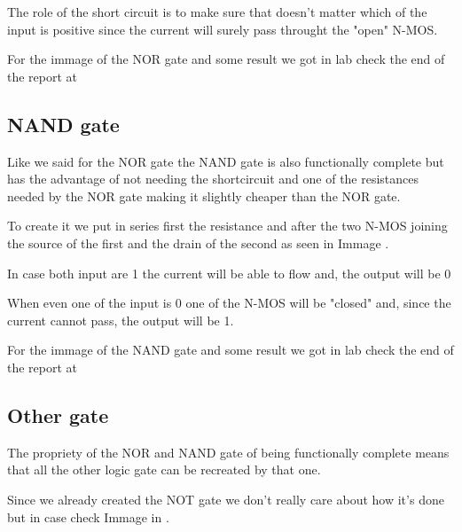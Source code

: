 \documentclass{article}
\begin{document}
The role of the short circuit is to make sure that doesn't matter which of the input is positive since the current will surely pass throught the "open" N-MOS.

\vspace{3mm}

For the immage of the NOR gate and some result we got in lab check the end of the report at %

\subsection{NAND gate}

Like we said for the NOR gate the NAND gate is also functionally complete but has the advantage of not needing the shortcircuit and one of the resistances needed by the NOR gate making it slightly cheaper than the NOR gate. 

To create it we put in series first the resistance and after the two N-MOS joining the source of the first and the drain of the second as seen in Immage%
.

\vspace{3mm} %

In case both input are 1 the current will be able to flow and, the output will be 0

When even one of the input is 0 one of the N-MOS will be "closed" and, since the current cannot pass, the output will be 1.

\vspace{3mm}

For the immage of the NAND gate and some result we got in lab check the end of the report at %



\subsection{Other gate}

The propriety of the NOR and NAND gate of being functionally complete means that all the other logic gate can be recreated by that one. 

Since we already created the NOT gate we don't really care about how it's done but in case check Immage %
in %
. 
\end{document}
